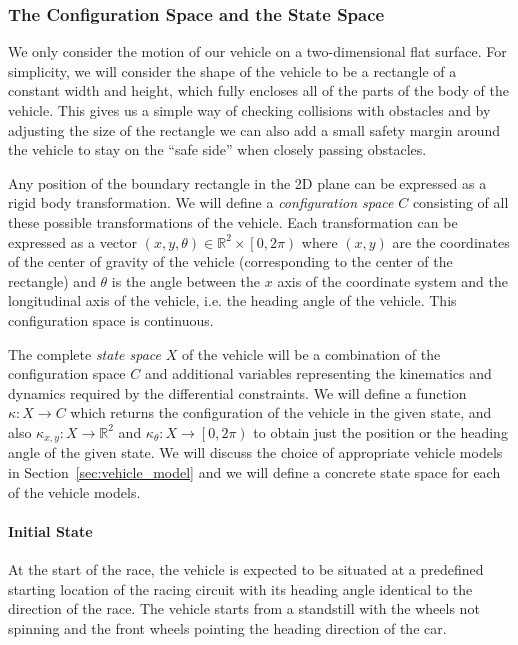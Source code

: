 \subsubsection{The Configuration Space and the State Space}
\label{sec:configuration_and_state_space}

We only consider the motion of our vehicle on a two-dimensional flat surface. For simplicity, we will consider the shape of the vehicle to be a rectangle of a constant width and height, which fully encloses all of the parts of the body of the vehicle. This gives us a simple way of checking collisions with obstacles and by adjusting the size of the rectangle we can also add a small safety margin around the vehicle to stay on the ``safe side'' when closely passing obstacles.

Any position of the boundary rectangle in the 2D plane can be expressed as a rigid body transformation. We will define a \textit{configuration space} $C$ consisting of all these possible transformations of the vehicle. Each transformation can be expressed as a vector $\left( x, y, \theta\right)\in \mathbb{R}^2\times \left[0, 2\pi\right)$ where $\left( x, y\right)$ are the coordinates of the center of gravity of the vehicle (corresponding to the center of the rectangle) and $\theta$ is the angle between the $x$ axis of the coordinate system and the longitudinal axis of the vehicle, i.e. the heading angle of the vehicle.  This configuration space is continuous.

The complete \textit{state space} $X$ of the vehicle will be a combination of the configuration space $C$ and additional variables representing the kinematics and dynamics required by the differential constraints. We will define a function $\kappa: X\rightarrow C$ which returns the configuration of the vehicle in the given state, and also $\kappa_{x,y}: X\rightarrow \mathbb{R}^2$ and $\kappa_\theta: X\rightarrow \left[0, 2\pi\right)$ to obtain just the position or the heading angle of the given state. We will discuss the choice of appropriate vehicle models in Section~\ref{sec:vehicle_model} and we will define a concrete state space for each of the vehicle models.

\paragraph{Initial State}
At the start of the race, the vehicle is expected to be situated at a predefined starting location of the racing circuit with its heading angle identical to the direction of the race. The vehicle starts from a standstill with the wheels not spinning and the front wheels pointing the heading direction of the car.

